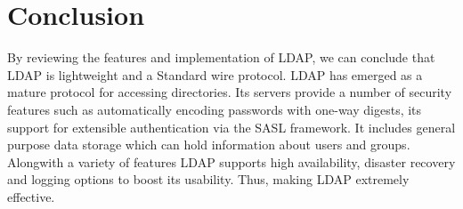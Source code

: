 \documentclass[9pt,twocolumn,twoside]{../../styles/osajnl}
\begin{document}
\section{Conclusion}
By reviewing the features and implementation of LDAP, we can conclude
that LDAP is lightweight and a Standard wire protocol. LDAP has
emerged as a mature protocol for accessing directories. Its servers
provide a number of security features such as automatically encoding
passwords with one-way digests, its support for extensible
authentication via the SASL framework. It includes general purpose
data storage which can hold information about users and
groups. Alongwith a variety of features LDAP supports high
availability, disaster recovery and logging options to boost its
usability. Thus, making LDAP extremely effective.





 
\end{document}
